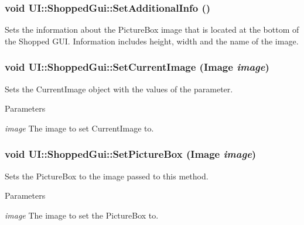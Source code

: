 \hypertarget{class_u_i_1_1_shopped_gui_a292a827437d7f2098c13bc1a735a569e}{
\subsubsection[{SetAdditionalInfo}]{\setlength{\rightskip}{0pt plus 5cm}void UI::ShoppedGui::SetAdditionalInfo ()}}
\label{class_u_i_1_1_shopped_gui_a292a827437d7f2098c13bc1a735a569e}
Sets the information about the PictureBox image that is located at the bottom of the Shopped GUI. Information includes height, width and the name of the image. \hypertarget{class_u_i_1_1_shopped_gui_ae6c209174dca46445f9e83ba41180a62}{
\subsubsection[{SetCurrentImage}]{\setlength{\rightskip}{0pt plus 5cm}void UI::ShoppedGui::SetCurrentImage (Image {\em image})}}
\label{class_u_i_1_1_shopped_gui_ae6c209174dca46445f9e83ba41180a62}
Sets the CurrentImage object with the values of the parameter. 
\begin{DoxyParams}{Parameters}
\item[{\em image}]The image to set CurrentImage to. \end{DoxyParams}
\hypertarget{class_u_i_1_1_shopped_gui_a61ba32572b328bdc7f6e835eff9eb946}{
\subsubsection[{SetPictureBox}]{\setlength{\rightskip}{0pt plus 5cm}void UI::ShoppedGui::SetPictureBox (Image {\em image})}}
\label{class_u_i_1_1_shopped_gui_a61ba32572b328bdc7f6e835eff9eb946}
Sets the PictureBox to the image passed to this method. 
\begin{DoxyParams}{Parameters}
\item[{\em image}]The image to set the PictureBox to. \end{DoxyParams}
